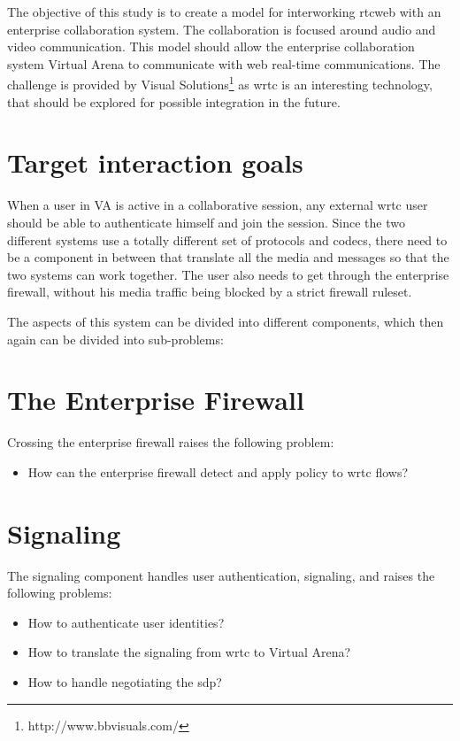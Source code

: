 
The objective of this study is to create a model for interworking \gls{rtcweb} with an enterprise collaboration system. The collaboration is focused around audio and video communication. This model should allow the enterprise collaboration system Virtual Arena to communicate with web real-time communications. The challenge is provided by Visual Solutions\footnote{http://www.bbvisuals.com/} as \gls{wrtc} is an interesting technology, that should be explored for possible integration in the future.

\section{Target interaction goals}
When a user in VA is active in a collaborative session, any external \gls{wrtc} user should be able to authenticate himself and join the session. Since the two different systems use a totally different set of protocols and codecs, there need to be a component in between that translate all the media and messages so that the two systems can work together. The user also needs to get through the enterprise firewall, without his media traffic being blocked by a strict firewall ruleset.

The aspects of this system can be divided into different components, which then again can be divided into sub-problems:

\section{The Enterprise Firewall}
Crossing the enterprise firewall raises the following problem:
\begin{itemize}
\item{How can the enterprise firewall detect and apply policy to \gls{wrtc} flows?}
\end{itemize}

\section{Signaling}
The signaling component handles user authentication, signaling, and raises the following problems:
\begin{itemize}
\item{How to authenticate user identities?}
\item{How to translate the signaling from \gls{wrtc} to Virtual Arena?}
\item{How to handle negotiating the \gls{sdp}?}
\end{itemize}

